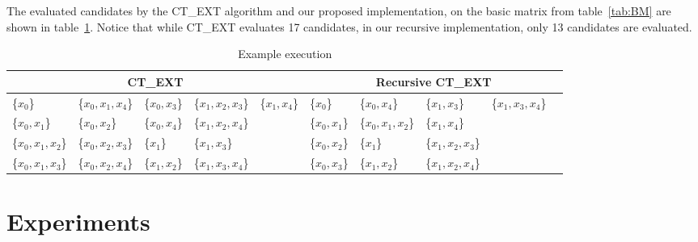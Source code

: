\documentclass[citeauthoryear]{llncs}
\begin{document}
	
	The evaluated candidates by the CT\_EXT algorithm and our proposed implementation, on the basic matrix from
	table~\ref{tab:BM} are shown in table~\ref{tab:run}. Notice that while CT\_EXT evaluates 17 candidates,
	in our recursive implementation, only 13 candidates are evaluated.
	
	\begin{table}[!htb]\label{tab:run}\scriptsize
		\setlength{\tabcolsep}{.05em}
		\caption{Example execution}
      	\centering
    		\begin{tabular}{|lllll|lllll|}
    		\hline
    		\multicolumn{5}{|c|}{CT\_EXT} & \multicolumn{5}{c|}{Recursive CT\_EXT}\\
    		\hline
    		\{$ x_0$\} 	 		& \{$x_0,x_1,x_4$\}	& \{$x_0,x_3$\}		& \{$x_1,x_2,x_3$\}	& \{$x_1,x_4$\}	
    		& \{$x_0$\}			& \{$x_0,x_4$\} 		& \{$x_1,x_3$\} 		& \{$x_1,x_3,x_4$\}	&\\
    		\{$x_0,x_1$\} 		& \{$x_0,x_2$\}  	& \{$x_0,x_4$\}		& \{$x_1,x_2,x_4$\}	& 
    		& \{$x_0,x_1$\}		& \{$x_0,x_1,x_2$\} 	& \{$x_1,x_4$\}		&&\\
    		\{$x_0,x_1,x_2$\}	& \{$x_0,x_2,x_3$\}	& \{$x_1$\}			& \{$x_1,x_3$\}	  	&			
    		& \{$x_0,x_2$\} 		& \{$x_1$\}		 	& \{$x_1,x_2,x_3$\}	&&\\
    		\{$x_0,x_1,x_3$\} 	& \{$x_0,x_2,x_4$\}	& \{$x_1,x_2$\} 		& \{$x_1,x_3,x_4$\}	&			
    		& \{$x_0,x_3$\} 		& \{$x_1,x_2$\}	 	& \{$x_1,x_2,x_4$\}	&&\\
    		\hline
		\end{tabular}
	\end{table}
%
\section{Experiments}
%
%
\end{document}
